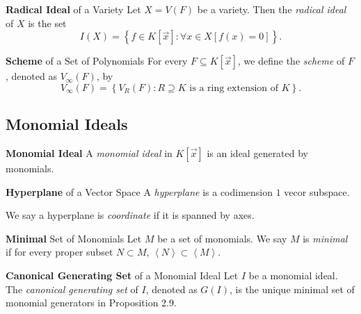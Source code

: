 \documentclass[11pt]{article}
\begin{document}
    \begin{definition}{\textbf{Radical Ideal} of a Variety}
        Let $X = V\left( F \right)$ be a variety. Then the \emph{radical ideal} of $X$ is the set
        \begin{equation*}
            I\left( X \right) = \left\lbrace f\in K\left[ \vec{x} \right] : \forall x\in X\left[ f\left( x \right)=0 \right] \right\rbrace.
        \end{equation*}
    \end{definition}

    \begin{definition}{\textbf{Scheme} of a Set of Polynomials}
        For every $F\subseteq K\left[ \vec{x} \right]$, we define the \emph{scheme} of $F$, denoted as $V_{\infty}\left( F \right)$, by
        \begin{equation*}
            V_{\infty}\left( F \right) = \left\lbrace V_R\left( F \right) : \text{$R\supseteq K$ is a ring extension of $K$} \right\rbrace.
        \end{equation*}
    \end{definition}

    \subsection{Monomial Ideals}
    
    \begin{definition}{\textbf{Monomial Ideal}}
        A \emph{monomial ideal} in $K\left[ \vec{x} \right]$ is an ideal generated by monomials.
    \end{definition}

    \begin{definition}{\textbf{Hyperplane} of a Vector Space}
        A \emph{hyperplane} is a codimension $1$ vecor subspace.

        We say a hyperplane is \emph{coordinate} if it is spanned by axes.
    \end{definition}
    
    \begin{definition}{\textbf{Minimal} Set of Monomials}
        Let $M$ be a set of monomials. We say $M$ is \emph{minimal} if for every proper subset $N\subset M$, $\left< N \right> \subset \left< M \right> $.   
    \end{definition}
    
    \begin{definition}{\textbf{Canonical Generating Set} of a Monomial Ideal}
        Let $I$ be a monomial ideal. The \emph{canonical generating set} of $I$, denoted as $G\left( I \right)$, is the unique minimal set of monomial generators in Proposition 2.9.
    \end{definition}
    
\end{document}
